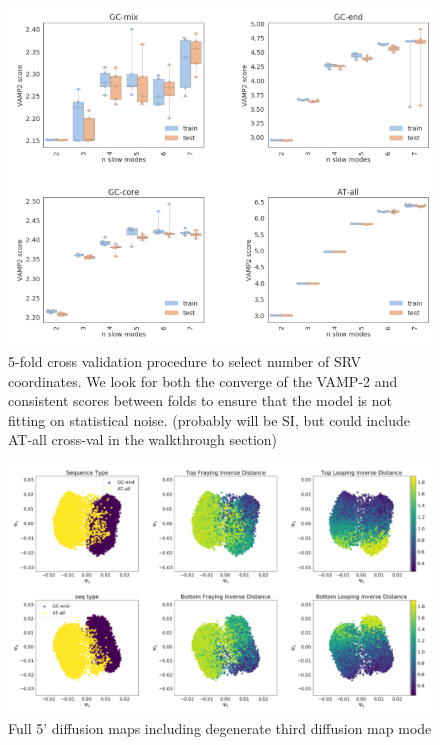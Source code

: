 \documentclass[journal=jpcbfk,manuscript=article]{achemso}
\begin{document}
\begin{figure}[ht!]
	\begin{center}
        \includegraphics[width=\textwidth]{Figs/figs_0804/srv_crossval.png}
        \caption{5-fold cross validation procedure to select number of SRV coordinates. We look for both the converge of the VAMP-2 and consistent scores between folds to ensure that the model is not fitting on statistical noise. (probably will be SI, but could include AT-all cross-val in the walkthrough section)}
        \label{fig:srv_crossval}
	\end{center}
\end{figure}

\begin{figure}[ht!]
	\begin{center}
        \includegraphics[width=\textwidth]{Figs/figs_0804/GC-end_dmaps_full.PNG}
        \caption{Full 5' diffusion maps including degenerate third diffusion map mode}
        \label{fig:GC-end_dmaps_full}
	\end{center}
\end{figure}
\end{document}
